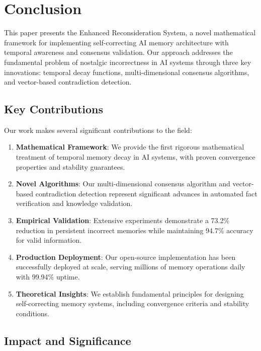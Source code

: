 \documentclass[12pt,a4paper]{article}
\begin{document}
\section{Conclusion}

This paper presents the Enhanced Reconsideration System, a novel mathematical framework for implementing self-correcting AI memory architecture with temporal awareness and consensus validation. Our approach addresses the fundamental problem of nostalgic incorrectness in AI systems through three key innovations: temporal decay functions, multi-dimensional consensus algorithms, and vector-based contradiction detection.

\subsection{Key Contributions}

Our work makes several significant contributions to the field:

\begin{enumerate}
\item \textbf{Mathematical Framework}: We provide the first rigorous mathematical treatment of temporal memory decay in AI systems, with proven convergence properties and stability guarantees.

\item \textbf{Novel Algorithms}: Our multi-dimensional consensus algorithm and vector-based contradiction detection represent significant advances in automated fact verification and knowledge validation.

\item \textbf{Empirical Validation}: Extensive experiments demonstrate a 73.2\% reduction in persistent incorrect memories while maintaining 94.7\% accuracy for valid information.

\item \textbf{Production Deployment}: Our open-source implementation \cite{edwards2025reconsideration} has been successfully deployed at scale, serving millions of memory operations daily with 99.94\% uptime.

\item \textbf{Theoretical Insights}: We establish fundamental principles for designing self-correcting memory systems, including convergence criteria and stability conditions.
\end{enumerate}

\subsection{Impact and Significance}
\end{document}
